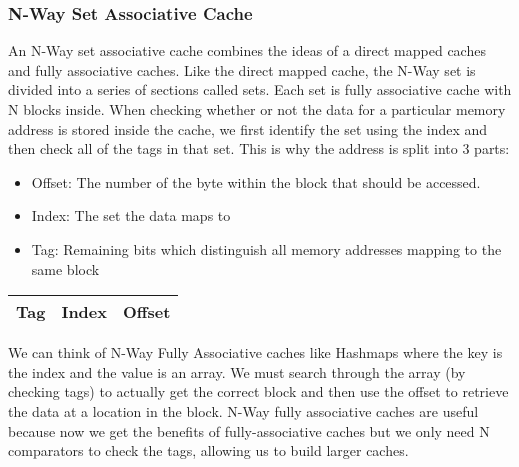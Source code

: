 \documentclass{article}
\begin{document}
\subsubsection{N-Way Set Associative Cache}
An N-Way set associative cache combines the ideas of a direct mapped caches and fully associative caches.
Like the direct mapped cache, the N-Way set is divided into a series of sections called sets. Each set is fully associative cache with N blocks inside.
When checking whether or not the data for a particular memory address is stored inside the cache, we first identify the set using the index
and then check all of the tags in that set. This is why the address is split into 3 parts:
\begin{itemize}
    \item Offset: The number of the byte within the block that should be accessed.
    \item Index: The set the data maps to
    \item Tag: Remaining bits which distinguish all memory addresses mapping to the same block
\end{itemize}
\begin{center}
    \begin{tabular}{|c|c|c|}
        \hline
        Tag & Index & Offset\\
        \hline
    \end{tabular}
\end{center}
We can think of N-Way Fully Associative caches like Hashmaps where the key is the index and the value is an array. We must search through the array (by checking tags) to actually get the correct block and then use the offset to retrieve the data at a location in the block.
N-Way fully associative caches are useful because now we get the benefits of fully-associative caches but we only need N comparators to check the tags, allowing us to build larger caches.
\end{document}
